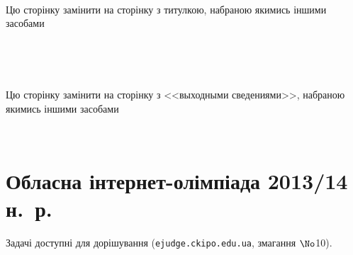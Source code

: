 \documentclass[14pt,a4paper]{extarticle}
\begin{document}
\def\myhrulefill{\vspace{12mm}\par\vspace*{-12mm}\par\hrulefill}

\newenvironment{problemAllDefault}[1]{\vspace{10mm}\par\begin{problem}{#1}{Клавіатура (stdin)}{Екран (stdout)}{1 сек}{64 мегабайти}}{\end{problem}}



\begin{center}

\begin{huge}

~

\vfill

Цю сторінку замінити на сторінку з титулкою, набраною якимись іншими засобами

\vfill

~

\clearpage

~

\vfill

Цю сторінку замінити на сторінку з <<выходными сведениями>>, набраною якимись іншими засобами

\vfill

~

\end{huge}

\end{center}

\clearpage


\section{Обласна інтернет-олімпіада 2013/14 н.~р.}

Задачі доступні для дорішування (\verb"ejudge.ckipo.edu.ua", змагання $\No$10).

\renewenvironment{problemAllDefault}[1]{\vspace{10mm}\par\begin{problem}{#1}{Клавіатура (stdin)}{Екран (stdout)}{1 сек}{64 мегабайти}}{\end{problem}}
\end{document}
